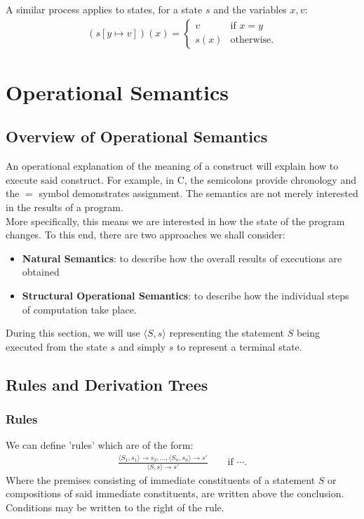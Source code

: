 \documentclass[a4paper, 12pt, twoside]{article}
\begin{document}
A similar process applies to states, for a state $s$ and the variables
$x, v$: \begin{gather*}
  (s[y\mapsto v])(x) = \begin{cases}
    v & \text{if } x = y \\
    s(x) & \text{otherwise}.
  \end{cases}
\end{gather*}

\newpage

\section{Operational Semantics}

\subsection{Overview of Operational Semantics}

An operational explanation of the meaning of a construct will explain
how to execute said construct. For example, in C, the semicolons provide
chronology and the $=$ symbol demonstrates assignment. The semantics
are not merely interested in the results of a program.
\\[\baselineskip]
More specifically, this means we are interested in how the state of the
program changes. To this end, there are two approaches we shall consider:
\begin{itemize}
  \item \textbf{Natural Semantics}: to describe how the overall
  results of executions are obtained
  \item \textbf{Structural Operational Semantics}: to describe how
  the individual steps of computation take place.
\end{itemize} During this section, we will use $\langle S, s\rangle$
representing the statement $S$ being executed from the state $s$ and
simply $s$ to represent a terminal state.

\subsection{Rules and Derivation Trees}

\subsubsection{Rules}

We can define 'rules' which are of the form: \begin{gather*}
  \frac{
    \langle S_1, s_1 \rangle \to s_2, \ldots, \langle S_n, s_n \rangle \to s'
  }{
    \langle S, s \rangle \to s'
  } \qquad \text{if } \cdots.
\end{gather*} Where the premises consisting of immediate constituents 
of a statement $S$ or compositions of said immediate constituents, 
are written above the conclusion. Conditions may be written to the right
of the rule.
\end{document}
